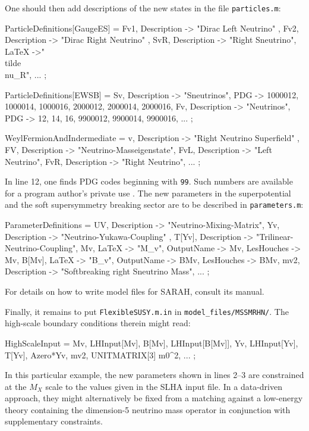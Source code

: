 \documentclass[final,3p,11pt,pdflatex]{elsarticle}
\makeatletter
\newcommand{\sarah}{SARAH\@\xspace}
\newcommand{\code}[1]{\lstinline|#1|}  %
\makeatother
\begin{document}
One should then add descriptions of the new states in the file
\code{particles.m}:
\begin{numlstlisting}
ParticleDefinitions[GaugeES] = {
  {Fv1, { Description -> "Dirac Left Neutrino" }},
  {Fv2, { Description -> "Dirac Right Neutrino" }},
  {SvR, { Description -> "Right Sneutrino", LaTeX ->"\\tilde{\\nu}_R"}},
  ...
};

ParticleDefinitions[EWSB] = {
  {Sv, { Description -> "Sneutrinos",
         PDG -> {1000012, 1000014, 1000016, 2000012, 2000014, 2000016}}},
  {Fv, { Description -> "Neutrinos",
         PDG -> {12, 14, 16, 9900012, 9900014, 9900016}}},
  ...
};

WeylFermionAndIndermediate = {
  {v,   { Description -> "Right Neutrino Superfield" }},
  {FV,  { Description -> "Neutrino-Masseigenstate"}},
  {FvL, { Description -> "Left Neutrino"}},
  {FvR, { Description -> "Right Neutrino"}},
  ...
};
\end{numlstlisting}
In line 12, one finds PDG codes beginning with \code{99}.
Such numbers are available for a program author's private use
\cite{Beringer:1900zz}.
The new parameters in the superpotential
and the soft supersymmetry breaking sector
are to be described in \code{parameters.m}:
\begin{numlstlisting}
ParameterDefinitions = {
  {UV,    { Description -> "Neutrino-Mixing-Matrix"}},
  {Yv,    { Description -> "Neutrino-Yukawa-Coupling" }},
  {T[Yv], { Description -> "Trilinear-Neutrino-Coupling"}},
  {Mv,    { LaTeX -> "M_v", OutputName -> Mv, LesHouches -> Mv}},
  {B[Mv], { LaTeX -> "B_v", OutputName -> BMv, LesHouches -> BMv}},
  {mv2,   { Description -> "Softbreaking right Sneutrino Mass"}},
  ...
};
\end{numlstlisting}
For details on how to write model files for \sarah, consult its manual.

Finally, it remains to put \code{FlexibleSUSY.m.in}
in \code{model_files/MSSMRHN/}.
The high-scale boundary conditions therein might read:
\begin{numlstlisting}
HighScaleInput = {
  {Mv, LHInput[Mv]}, {B[Mv], LHInput[B[Mv]]},
  {Yv, LHInput[Yv]}, {T[Yv], Azero*Yv},
  {mv2, UNITMATRIX[3] m0^2},
  ...
};
\end{numlstlisting}
In this particular example,
the new parameters shown in lines 2--3
are constrained at the $M_X$ scale
to the values given in the SLHA input file.
In a data-driven approach,
they might alternatively be fixed from a matching against
a low-energy theory containing the dimension-5
neutrino mass operator in conjunction with supplementary constraints.
\end{document}
